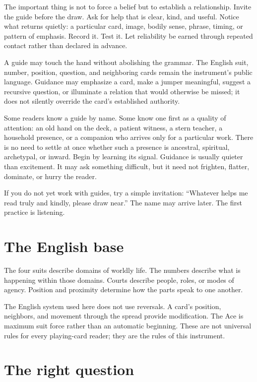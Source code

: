 The important thing is not to force a belief but to establish a relationship.
Invite the guide before the draw. Ask for help that is clear, kind, and useful.
Notice what returns quietly: a particular card, image, bodily sense, phrase,
timing, or pattern of emphasis. Record it. Test it. Let reliability be earned
through repeated contact rather than declared in advance.

A guide may touch the hand without abolishing the grammar. The English suit,
number, position, question, and neighboring cards remain the instrument's
public language. Guidance may emphasize a card, make a jumper meaningful,
suggest a recursive question, or illuminate a relation that would otherwise be
missed; it does not silently override the card's established authority.

Some readers know a guide by name. Some know one first as a quality of
attention: an old hand on the deck, a patient witness, a stern teacher, a
household presence, or a companion who arrives only for a particular work.
There is no need to settle at once whether such a presence is ancestral,
spiritual, archetypal, or inward. Begin by learning its signal. Guidance is
usually quieter than excitement. It may ask something difficult, but it need
not frighten, flatter, dominate, or hurry the reader.

If you do not yet work with guides, try a simple invitation: ``Whatever helps
me read truly and kindly, please draw near.'' The name may arrive later. The
first practice is listening.

\section{The English base}

The four suits describe domains of worldly life. The numbers describe what is
happening within those domains. Courts describe people, roles, or modes of
agency. Position and proximity determine how the parts speak to one another.

The English system used here does not use reversals. A card's position,
neighbors, and movement through the spread provide modification. The Ace is
maximum suit force rather than an automatic beginning. These are not universal
rules for every playing-card reader; they are the rules of this instrument.

\section{The right question}

